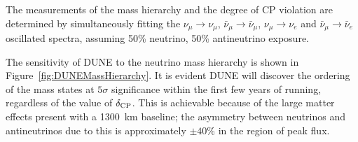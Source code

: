 The measurements of the mass hierarchy and the degree of CP violation are determined by simultaneously fitting the $\nu_{\mu}\rightarrow\nu_{\mu}$, $\bar{\nu}_{\mu}\rightarrow\bar{\nu}_{\mu}$, $\nu_{\mu}\rightarrow\nu_e$ and $\bar{\nu}_{\mu}\rightarrow\bar{\nu}_e$ oscillated spectra, assuming 50\% neutrino, 50\% antineutrino exposure.

The sensitivity of DUNE to the neutrino mass hierarchy is shown in Figure~\ref{fig:DUNEMassHierarchy}.  It is evident DUNE will discover the ordering of the mass states at $5\sigma$ significance within the first few years of running, regardless of the value of $\delta_{\textnormal{CP}}$.  This is achievable because of the large matter effects present with a 1300~km baseline; the asymmetry between neutrinos and antineutrinos due to this is approximately $\pm40$\% in the region of peak flux.


